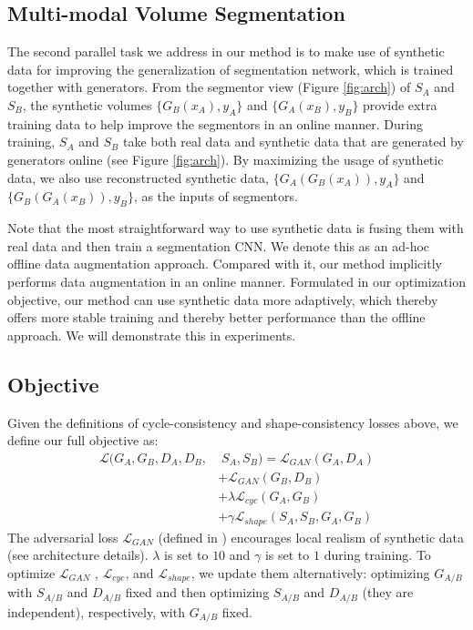 \documentclass[10pt,twocolumn,letterpaper]{article}
\begin{document}
\subsection{Multi-modal Volume Segmentation}
The second parallel task we address in our method is to make use of synthetic data for improving the generalization of segmentation network, which is trained together with generators. 
From the segmentor view (Figure \ref{fig:arch}) of $S_A$ and $S_B$,  the synthetic volumes $\{G_B(x_A), y_A\}$ and $\{G_A(x_B), y_B\}$ provide extra training data to help improve the segmentors in an online manner. During training, $S_A$ and $S_B$ take both real data and synthetic data that are generated by generators online (see Figure \ref{fig:arch}). 
By maximizing the usage of synthetic data, we also use reconstructed synthetic data, $\{G_A(G_B(x_A)), y_A\}$ and $\{G_B(G_A(x_B)), y_B\}$, as the inputs of segmentors. 

Note that the most straightforward way to use synthetic data is fusing them with real data and then train a segmentation CNN. We denote this as an ad-hoc offline data augmentation approach. Compared with it, our method implicitly performs data augmentation in an online manner. Formulated in our optimization objective, our method can use synthetic data more adaptively, which thereby offers more stable training and thereby better performance than the offline approach. We will demonstrate this in experiments.


\subsection{Objective}
Given the definitions of cycle-consistency and shape-consistency losses above, we define our full objective as:  
\begin{equation}
\begin{split}
\mathcal{L}(G_{A}, G_{B},  D_{A}, D_{B}, & \; S_{A}, S_{B})  = \mathcal{L}_{GAN}(G_A, D_A) \\
& + \mathcal{L}_{GAN}(G_B, D_B) \\
& + \lambda \mathcal{L}_{cyc}(G_A, G_B) \\
& + \gamma \mathcal{L}_{shape}(S_A,  S_B, G_A, G_B) 
\end{split}
\end{equation}
The adversarial loss $\mathcal{L}_{GAN}$ (defined in \cite{zhu2017unpaired,isola2016image}) encourages local realism of synthetic data (see architecture details). $\lambda$ is set to $10$ and $\gamma$ is set to $1$ during training. 
To optimize $\mathcal{L}_{GAN}$ , $\mathcal{L}_{cyc}$, and $\mathcal{L}_{shape}$, we update them alternatively: optimizing $G_{A/B}$ with $S_{A/B}$ and $D_{A/B}$ fixed and then optimizing $S_{A/B}$ and $D_{A/B}$ (they are independent), respectively, with $G_{A/B}$ fixed. 
\end{document}
